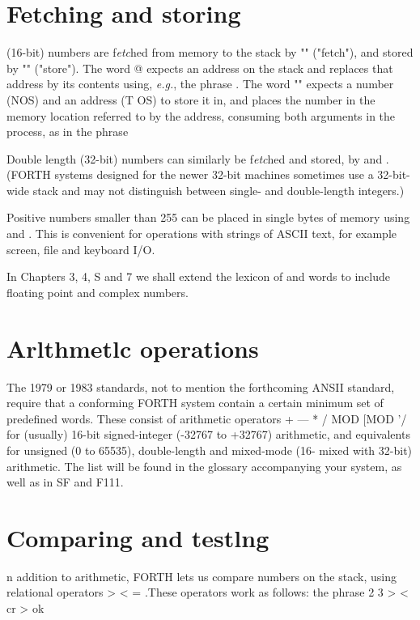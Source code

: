 \section{Fetching and storing}

 (16-bit) numbers are f\textit{etc}hed from memory to the stack by "" ("fetch"), and stored by "\bc{!}" ("store"). The word @ expects an address on the stack and replaces that address by its contents using, \textit{e.g.}, the phrase . The word "\regc{!}" expects a number (NOS) and an address (T OS) to store it in, and places the number in the memory location referred to by the address, consuming both arguments in the process, as in the phrase 

Double length (32-bit) numbers can similarly be f\textit{etc}hed and stored, by  and  . (FORTH systems designed for the newer 32-bit machines sometimes use a 32-bit-wide stack and may not distinguish between single- and double-length integers.)

Positive numbers smaller than 255 can be placed in single bytes of memory using  and . This is convenient for operations with strings of ASCII text, for example screen, file and keyboard I/O.

In Chapters 3, 4, S and 7 we shall extend the lexicon of  and \regc{!} words to include floating point and complex numbers.

\section{Arlthmetlc operations}

The 1979 or 1983 standards, not to mention the forthcoming ANSII standard, require that a conforming FORTH system contain a certain minimum set of predefined words. These consist of arithmetic operators + — * / MOD [MOD '/ for (usually) 16-bit signed-integer (-32767 to +32767) arithmetic, and equivalents for unsigned (0 to 65535), double-length and mixed-mode (16- mixed with 32-bit) arithmetic. The list will be found in the glossary accompanying your system, as well as in SF and F111.

\section{Comparing and testlng}

n addition to arithmetic, FORTH lets us compare numbers on the stack, using relational operators > < = .These operators work as follows: the phrase
2 3 > < cr > ok


